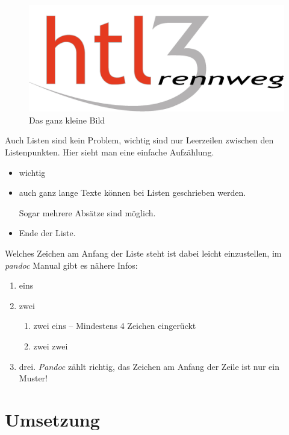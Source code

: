 \documentclass[a4paper,ngerman,naustrian,DIV=12,BCOR=1cm]{scrbook}
\begin{document}

\begin{figure}[htbp]
\centering
\includegraphics{HTL3RLogo.png}
\caption{Das ganz kleine Bild}
\end{figure}

Auch Listen sind kein Problem, wichtig sind nur Leerzeilen zwischen den
Listenpunkten. Hier sieht man eine einfache Aufzählung.

\begin{itemize}
\item
  wichtig
\item
  auch ganz lange Texte können bei Listen geschrieben werden.

  Sogar mehrere Absätze sind möglich.
\item
  Ende der Liste.
\end{itemize}

Welches Zeichen am Anfang der Liste steht ist dabei leicht einzustellen,
im \emph{pandoc} Manual gibt es nähere Infos:

\begin{enumerate}
\def\labelenumi{\arabic{enumi}.}
\item
  eins
\item
  zwei

  \begin{enumerate}
  \def\labelenumii{\roman{enumii}.}
  \itemsep1pt\parskip0pt
  \item
    zwei eins -- Mindestens 4 Zeichen eingerückt
  \item
    zwei zwei
  \end{enumerate}
\item
  drei. \emph{Pandoc} zählt richtig, das Zeichen am Anfang der Zeile ist
  nur ein Muster!
\end{enumerate}


\chapter{Umsetzung}
\end{document}

